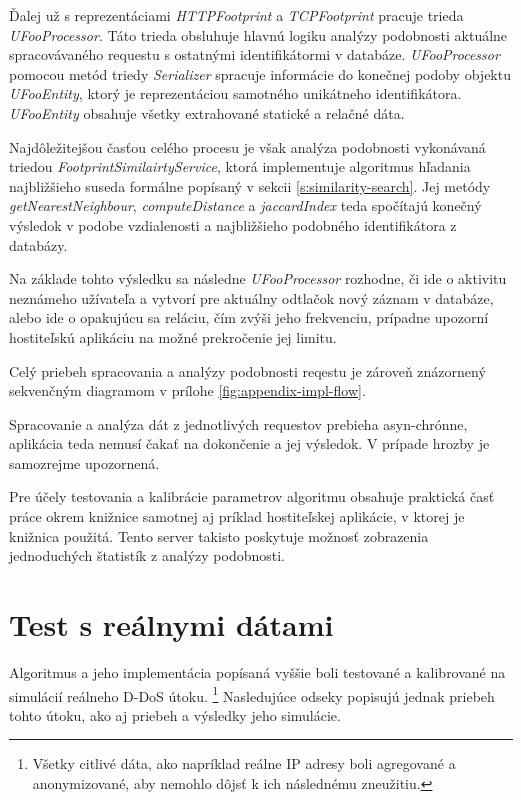 \documentclass[
  printed, %
  table,   %
  lof,     %
  nolot,   %
  nocover
]{fithesis3}
\begin{document}
Ďalej už s reprezentáciami \textit{HTTPFootprint} a \textit{TCPFootprint}
pracuje trieda \textit{UFooProcessor}. Táto trieda obsluhuje hlavnú logiku
analýzy podobnosti aktuálne spracovávaného requestu s ostatnými identifikátormi
v databáze. \textit{UFooProcessor} pomocou metód triedy \textit{Serializer} spracuje informácie do
konečnej podoby objektu \textit{UFooEntity}, ktorý je reprezentáciou samotného
unikátneho identifikátora. \textit{UFooEntity} obsahuje všetky extrahované
statické a relačné dáta.

Najdôležitejšou časťou celého procesu je však analýza podobnosti vykonávaná triedou
\textit{FootprintSimilairtyService}, ktorá implementuje algoritmus hľadania
najbližšieho suseda formálne popísaný v sekcii \ref{s:similarity-search}. Jej
metódy \textit{getNearestNeighbour},  \textit{computeDistance} a
\textit{jaccardIndex} teda spočítajú konečný výsledok v podobe vzdialenosti a
najbližšieho podobného identifikátora z databázy.

Na základe tohto výsledku sa následne \textit{UFooProcessor} rozhodne, či ide o
aktivitu neznámeho užívateľa a vytvorí pre aktuálny odtlačok nový záznam v
databáze, alebo ide o opakujúcu sa reláciu, čím zvýši jeho frekvenciu, prípadne
upozorní hostiteľskú aplikáciu na možné prekročenie jej limitu.

Celý priebeh spracovania a analýzy podobnosti reqestu je zároveň znázornený
sekvenčným diagramom v prílohe \ref{fig:appendix-impl-flow}.

Spracovanie a analýza dát z jednotlivých requestov prebieha asyn-chrónne,
aplikácia teda nemusí čakať na dokončenie a jej výsledok. V prípade hrozby je
samozrejme upozornená. 

Pre účely testovania a kalibrácie parametrov algoritmu obsahuje praktická časť práce okrem
knižnice samotnej aj príklad hostiteľskej aplikácie, v ktorej je knižnica
použitá. Tento server takisto poskytuje možnosť zobrazenia jednoduchých
štatistík z analýzy podobnosti.

\chapter{Test s reálnymi dátami}
\label{ch:data}
Algoritmus a jeho implementácia popísaná vyššie boli testované a kalibrované na
simulácií reálneho D-DoS útoku. \footnote{Všetky citlivé dáta, ako napríklad reálne IP
adresy boli agregované a anonymizované, aby nemohlo dôjsť k ich následnému
zneužitiu.} Nasledujúce odseky popisujú jednak priebeh tohto
útoku, ako aj priebeh a výsledky jeho simulácie. 
\end{document}
